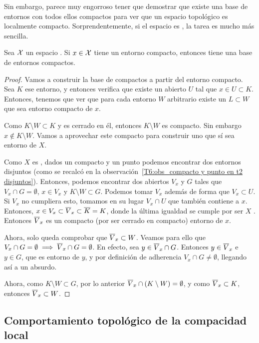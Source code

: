 Sin embargo, parece muy engorroso tener que demostrar que existe una base de entornos con todos ellos compactos para ver que un espacio topológico es localmente compacto. Sorprendentemente, si el espacio es \hausdorff, la tarea es mucho más sencilla.

\begin{prop}
	Sea $\mathcal{X}$ un espacio \hausdorff. Si $x\in \mathcal{X}$ tiene un entorno compacto, entonces tiene una base de entornos compactos.
	
	\begin{proof}
		Vamos a construir la base de compactos a partir del entorno compacto. Sea $K$ ese entorno, y entonces verifica que existe un abierto $U$ tal que $x\in U\subset K$. Entonces, tenemos que ver que para cada entorno $W$ arbitrario existe un $L\subset W$ que sea entorno compacto de $x$.
		
		Como $K\setminus W\subset K$ y es cerrado en él, entonces $K\setminus W$ es compacto. Sin embargo $x\notin K\setminus W$. Vamos a aprovechar este compacto para construir uno que sí sea entorno de $X$.
		
		Como $X$ es \hausdorff, dados un compacto y un punto podemos encontrar dos entornos disjuntos (como se recalcó en la observación~\ref{T6:obs_compacto y punto en t2 disjuntos}). Entonces, podemos encontrar dos abiertos $V_x$ y $G$ tales que $V_x\cap G=\emptyset$, $x\in V_x$ y $K\setminus W\subset G$. Podemos tomar $V_x$ además de forma que $V_x\subset U$. Si $V_x$ no cumpliera esto, tomamos en su lugar $V_x\cap U$ que también contiene a $x$. Entonces, $x\in V_x\subset \overline{V}_x\subset \overline{K}=K$, donde la última igualdad se cumple por ser $X$ \hausdorff. Entonces $\overline{V}_x$ es un compacto (por ser cerrado en compacto) entorno de $x$.
		
		Ahora, solo queda comprobar que $\overline{V}_x\subset W$. Veamos para ello que $V_x\cap G=\emptyset\implies \overline{V}_x\cap G=\emptyset$. En efecto, sea $y\in \overline{V}_x\cap G$. Entonces $y\in\overline{V}_x$ e $y\in G$, que es entorno de $y$, y por definición de adherencia $V_x \cap G\neq\emptyset$, llegando así a un absurdo.
	    
	    Ahora, como $K\setminus W\subset G$, por lo anterior $\overline{V}_x\cap (K\setminus W)=\emptyset$, y como $\overline{V}_x\subset K$, entonces $\overline{V}_x\subset W$.
	\end{proof}
\end{prop}

\subsection{Comportamiento topológico de la compacidad local}

